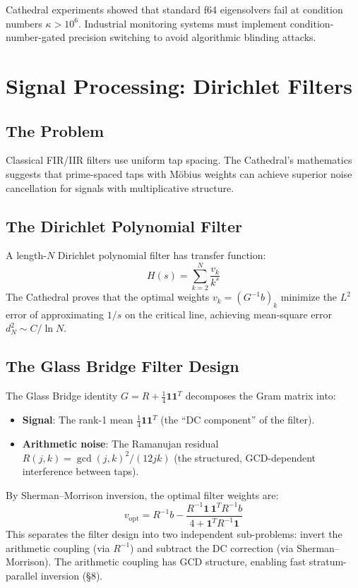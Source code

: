 \documentclass[11pt,a4paper]{article}
\begin{document}
Cathedral experiments showed that standard f64 eigensolvers fail
at condition numbers $\kappa > 10^6$. Industrial monitoring systems
must implement condition-number-gated precision switching to avoid
algorithmic blinding attacks.

\section{Signal Processing: Dirichlet Filters}

\subsection{The Problem}

Classical FIR/IIR filters use uniform tap spacing. The Cathedral's
mathematics suggests that prime-spaced taps with M\"obius weights
can achieve superior noise cancellation for signals with
multiplicative structure.

\subsection{The Dirichlet Polynomial Filter}

A length-$N$ Dirichlet polynomial filter has transfer function:
\[
  H(s) = \sum_{k=2}^{N} \frac{v_k}{k^s}
\]
The Cathedral proves that the optimal weights $v_k = (G^{-1}b)_k$
minimize the $L^2$ error of approximating $1/s$ on the critical
line, achieving mean-square error $d_N^2 \sim C/\ln N$.

\subsection{The Glass Bridge Filter Design}

The Glass Bridge identity $G = R + \frac{1}{4}\mathbf{1}\mathbf{1}^T$
decomposes the Gram matrix into:
\begin{itemize}
  \item \textbf{Signal}: The rank-1 mean $\frac{1}{4}\mathbf{1}\mathbf{1}^T$
    (the ``DC component'' of the filter).
  \item \textbf{Arithmetic noise}: The Ramanujan residual
    $R(j,k) = \gcd(j,k)^2/(12jk)$ (the structured, GCD-dependent
    interference between taps).
\end{itemize}
By Sherman--Morrison inversion, the optimal filter weights are:
\[
  v_{\text{opt}} = R^{-1}b - \frac{R^{-1}\mathbf{1}\,\mathbf{1}^T R^{-1}b}
    {4 + \mathbf{1}^T R^{-1}\mathbf{1}}
\]
This separates the filter design into two independent sub-problems:
invert the arithmetic coupling (via $R^{-1}$) and subtract the DC
correction (via Sherman--Morrison). The arithmetic coupling has
GCD structure, enabling fast stratum-parallel inversion (\S8).
\end{document}
